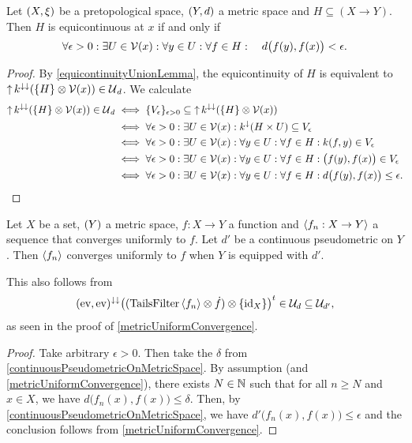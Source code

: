 \begin{proposition}
Let $\sSet{X,\xi}$ be a pretopological space, $\sSet{Y,d}$ a metric space and $H\subseteq (X\to Y)$. Then $H$ is equicontinuous at $x$ \textup{if and only if}
\[ \forall \epsilon >0: \exists U \in \operatorname{\mathcal{V}}(x): \forall y\in U: \forall f\in H: \quad d\big(f(y), f(x)\big) < \epsilon. \] 
\end{proposition}
\begin{proof}
By \ref{equicontinuityUnionLemma}, the equicontinuity of $H$ is equivalent to $\operatorname{\uparrow} k^{\downarrow\downarrow}(\{H\}\otimes \operatorname{\mathcal{V}}(x)) \in \operatorname{\mathcal{U}}_d$. We calculate
\begin{align*}
\operatorname{\uparrow} k^{\downarrow\downarrow}(\{H\}\otimes \operatorname{\mathcal{V}}(x)) \in \operatorname{\mathcal{U}}_d &\iff \{V_\epsilon\}_{\epsilon >0} \subseteq \operatorname{\uparrow} k^{\downarrow\downarrow}(\{H\}\otimes \operatorname{\mathcal{V}}(x)) \\
&\iff \forall \epsilon >0: \exists U\in \operatorname{\mathcal{V}}(x): k^{\downarrow}(H\times U) \subseteq V_\epsilon \\
&\iff \forall \epsilon >0: \exists U\in \operatorname{\mathcal{V}}(x): \forall y\in U: \forall f\in H: k(f, y) \in V_\epsilon \\
&\iff \forall \epsilon >0: \exists U\in \operatorname{\mathcal{V}}(x): \forall y\in U: \forall f\in H: \big(f(y), f(x)\big) \in V_\epsilon \\
&\iff \forall \epsilon >0: \exists U\in \operatorname{\mathcal{V}}(x): \forall y\in U: \forall f\in H: d\big(f(y), f(x)\big) \leq \epsilon.
\end{align*}
\end{proof}

\begin{lemma} \label{continuousPseudometricPreservesUniformConvergence}
Let $X$ be a set, $\sSet{Y}$ a metric space, $f: X\to Y$ a function and $\left\langle f_n: X\to Y \right\rangle$ a sequence that converges uniformly to $f$. Let $d'$ be a continuous pseudometric on $Y$. Then $\left\langle f_n \right\rangle$ converges uniformly to $f$ when $Y$ is equipped with $d'$.
\end{lemma}
This also follows from
\[ (\operatorname{ev}, \operatorname{ev})^{\downarrow\downarrow}\big((\operatorname{TailsFilter}\left\langle f_n \right\rangle \otimes \dot{f})\otimes \{\operatorname{id}_X\}\big)^t \in \mathcal{U}_d \subseteq \mathcal{U}_{d'}, \]
as seen in the proof of \ref{metricUniformConvergence}.
\begin{proof}
Take arbitrary $\epsilon > 0$. Then take the $\delta$ from \ref{continuousPseudometricOnMetricSpace}. By assumption (and \ref{metricUniformConvergence}), there exists $N\in \mathbb{N}$ such that for all $n\geq N$ and $x\in X$, we have $d\big(f_n(x), f(x)\big) \leq \delta$. Then, by \ref{continuousPseudometricOnMetricSpace}, we have $d'\big(f_n(x), f(x)\big) \leq \epsilon$ and the conclusion follows from \ref{metricUniformConvergence}.
\end{proof}

